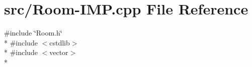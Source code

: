 \hypertarget{Room-IMP_8cpp}{\section{src/\-Room-\/\-I\-M\-P.cpp File Reference}
\label{Room-IMP_8cpp}
}
{\ttfamily \#include \char`\"{}Room.\-h\char`\"{}}\\*
{\ttfamily \#include $<$cstdlib$>$}\\*
{\ttfamily \#include $<$vector$>$}\\*
